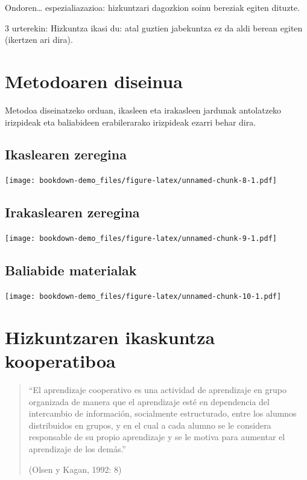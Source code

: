 \documentclass[]{book}
\begin{document}
Ondoren\ldots{} espezialiazazioa: hizkuntzari dagozkion soinu bereziak egiten dituzte.

3 urterekin: Hizkuntza ikasi du: atal guztien jabekuntza ez da aldi berean egiten (ikertzen ari dira).

\hypertarget{metodoaren-diseinua}{%
\section{Metodoaren diseinua}\label{metodoaren-diseinua}}

Metodoa diseinatzeko orduan, ikasleen eta irakasleen jardunak antolatzeko irizpideak eta baliabideen erabilerarako irizpideak ezarri behar dira.

\hypertarget{ikaslearen-zeregina}{%
\subsection{Ikaslearen zeregina}\label{ikaslearen-zeregina}}

\texttt{[image: bookdown-demo\_files/figure-latex/unnamed-chunk-8-1.pdf]}

\hypertarget{irakaslearen-zeregina}{%
\subsection{Irakaslearen zeregina}\label{irakaslearen-zeregina}}

\texttt{[image: bookdown-demo\_files/figure-latex/unnamed-chunk-9-1.pdf]}

\hypertarget{baliabide-materialak}{%
\subsection{Baliabide materialak}\label{baliabide-materialak}}

\texttt{[image: bookdown-demo\_files/figure-latex/unnamed-chunk-10-1.pdf]}

\hypertarget{hizkuntzaren-ikaskuntza-kooperatiboa}{%
\section{Hizkuntzaren ikaskuntza kooperatiboa}\label{hizkuntzaren-ikaskuntza-kooperatiboa}}

\begin{quote}
``El aprendizaje cooperativo es una actividad de aprendizaje en grupo organizada de manera que el aprendizaje esté en dependencia del intercambio de información, socialmente estructurado, entre los alumnos distribuidos en grupos, y en el cual a cada alumno se le considera responsable de su propio aprendizaje y se le motiva para aumentar el aprendizaje de los demás.''

(Olsen y Kagan, 1992: 8)
\end{quote}
\end{document}
